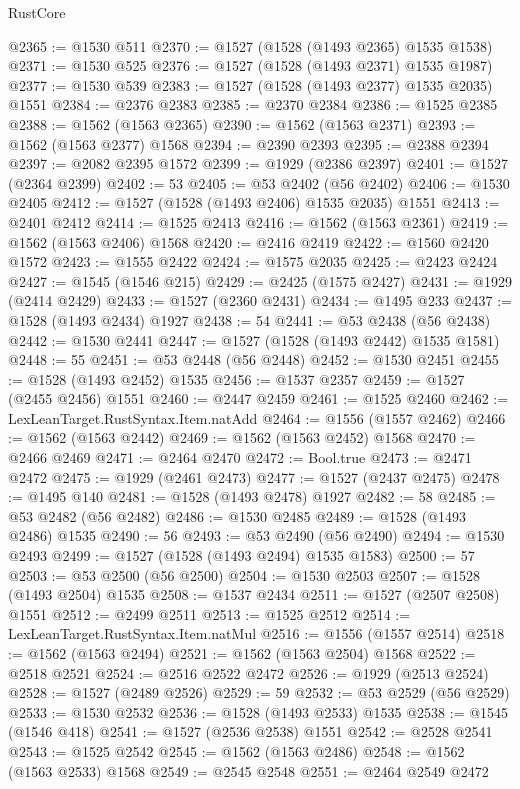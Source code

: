 \begin{lexlean}{RustCore}
\begin{coremodule}
@2365 := @1530 @511
@2370 := @1527 (@1528 (@1493 @2365) @1535 @1538)
@2371 := @1530 @525
@2376 := @1527 (@1528 (@1493 @2371) @1535 @1987)
@2377 := @1530 @539
@2383 := @1527 (@1528 (@1493 @2377) @1535 @2035) @1551
@2384 := @2376 @2383
@2385 := @2370 @2384
@2386 := @1525 @2385
@2388 := @1562 (@1563 @2365)
@2390 := @1562 (@1563 @2371)
@2393 := @1562 (@1563 @2377) @1568
@2394 := @2390 @2393
@2395 := @2388 @2394
@2397 := @2082 @2395 @1572
@2399 := @1929 (@2386 @2397)
@2401 := @1527 (@2364 @2399)
@2402 := 53
@2405 := @53 @2402 (@56 @2402)
@2406 := @1530 @2405
@2412 := @1527 (@1528 (@1493 @2406) @1535 @2035) @1551
@2413 := @2401 @2412
@2414 := @1525 @2413
@2416 := @1562 (@1563 @2361)
@2419 := @1562 (@1563 @2406) @1568
@2420 := @2416 @2419
@2422 := @1560 @2420 @1572
@2423 := @1555 @2422
@2424 := @1575 @2035
@2425 := @2423 @2424
@2427 := @1545 (@1546 @215)
@2429 := @2425 (@1575 @2427)
@2431 := @1929 (@2414 @2429)
@2433 := @1527 (@2360 @2431)
@2434 := @1495 @233
@2437 := @1528 (@1493 @2434) @1927
@2438 := 54
@2441 := @53 @2438 (@56 @2438)
@2442 := @1530 @2441
@2447 := @1527 (@1528 (@1493 @2442) @1535 @1581)
@2448 := 55
@2451 := @53 @2448 (@56 @2448)
@2452 := @1530 @2451
@2455 := @1528 (@1493 @2452) @1535
@2456 := @1537 @2357
@2459 := @1527 (@2455 @2456) @1551
@2460 := @2447 @2459
@2461 := @1525 @2460
@2462 := LexLeanTarget.RustSyntax.Item.natAdd
@2464 := @1556 (@1557 @2462)
@2466 := @1562 (@1563 @2442)
@2469 := @1562 (@1563 @2452) @1568
@2470 := @2466 @2469
@2471 := @2464 @2470
@2472 := Bool.true
@2473 := @2471 @2472
@2475 := @1929 (@2461 @2473)
@2477 := @1527 (@2437 @2475)
@2478 := @1495 @140
@2481 := @1528 (@1493 @2478) @1927
@2482 := 58
@2485 := @53 @2482 (@56 @2482)
@2486 := @1530 @2485
@2489 := @1528 (@1493 @2486) @1535
@2490 := 56
@2493 := @53 @2490 (@56 @2490)
@2494 := @1530 @2493
@2499 := @1527 (@1528 (@1493 @2494) @1535 @1583)
@2500 := 57
@2503 := @53 @2500 (@56 @2500)
@2504 := @1530 @2503
@2507 := @1528 (@1493 @2504) @1535
@2508 := @1537 @2434
@2511 := @1527 (@2507 @2508) @1551
@2512 := @2499 @2511
@2513 := @1525 @2512
@2514 := LexLeanTarget.RustSyntax.Item.natMul
@2516 := @1556 (@1557 @2514)
@2518 := @1562 (@1563 @2494)
@2521 := @1562 (@1563 @2504) @1568
@2522 := @2518 @2521
@2524 := @2516 @2522 @2472
@2526 := @1929 (@2513 @2524)
@2528 := @1527 (@2489 @2526)
@2529 := 59
@2532 := @53 @2529 (@56 @2529)
@2533 := @1530 @2532
@2536 := @1528 (@1493 @2533) @1535
@2538 := @1545 (@1546 @418)
@2541 := @1527 (@2536 @2538) @1551
@2542 := @2528 @2541
@2543 := @1525 @2542
@2545 := @1562 (@1563 @2486)
@2548 := @1562 (@1563 @2533) @1568
@2549 := @2545 @2548
@2551 := @2464 @2549 @2472

\end{coremodule}
\end{lexlean}
